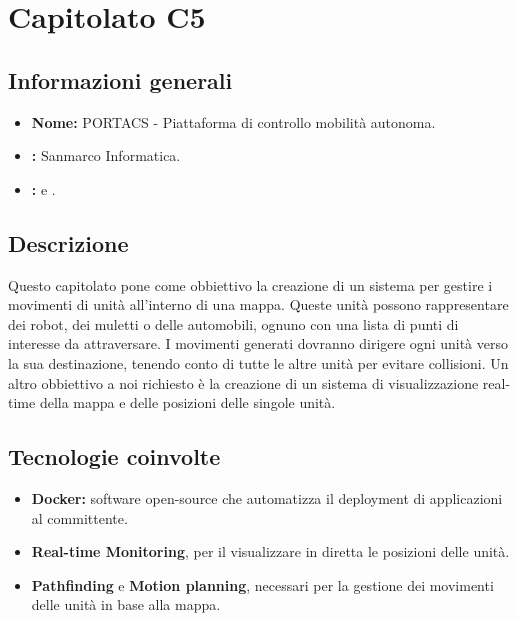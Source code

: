 \section{Capitolato C5}

\subsection{Informazioni generali}
\begin{itemize}
\item \textbf{Nome:} PORTACS - Piattaforma di controllo mobilità autonoma.
\item \textbf{\commitProg:} Sanmarco Informatica.
\item \textbf{\proponProg:} \VT{} e \CR.
\end{itemize}

\subsection{Descrizione}
Questo capitolato pone come obbiettivo la creazione di un sistema per gestire i movimenti di unità all'interno di una mappa. Queste unità possono rappresentare dei robot, dei muletti o delle automobili, ognuno con una lista di punti di interesse da attraversare. I movimenti generati dovranno dirigere ogni unità verso la sua destinazione, tenendo conto di tutte le altre unità per evitare collisioni.
Un altro obbiettivo a noi richiesto è la creazione di un sistema di visualizzazione real-time della mappa e delle posizioni delle singole unità.

\subsection{Tecnologie coinvolte}
\begin{itemize}
\item \textbf{Docker:} software open-source che automatizza il deployment di applicazioni al committente.
\item \textbf{Real-time Monitoring}, per il visualizzare in diretta le posizioni delle unità.
\item \textbf{Pathfinding} e \textbf{Motion planning}, necessari per la gestione dei movimenti delle unità in base alla mappa.
\end{itemize}

